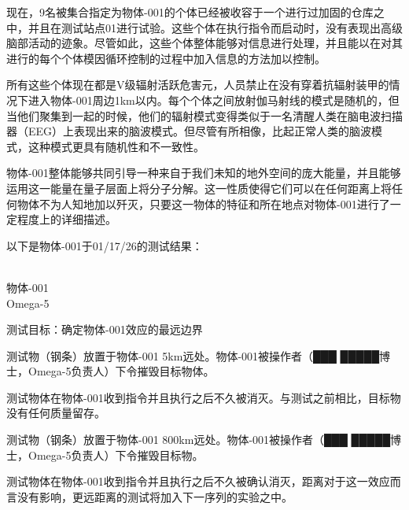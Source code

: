 \begin{scpboxbbwm}





现在，9名被集合指定为物体-001的个体已经被收容于一个进行过加固的仓库之中，并且在测试站点01进行试验。这些个体在执行指令而启动时，没有表现出高级脑部活动的迹象。尽管如此，这些个体整体能够对信息进行处理，并且能以在对其进行的每个个体模因循环控制的过程中加入信息的方法加以控制。

所有这些个体现在都是V级辐射活跃危害元，人员禁止在没有穿着抗辐射装甲的情况下进入物体-001周边1km以内。每个个体之间放射伽马射线的模式是随机的，但当他们聚集到一起的时候，他们的辐射模式变得类似于一名清醒人类在脑电波扫描器（EEG）上表现出来的脑波模式。但尽管有所相像，比起正常人类的脑波模式，这种模式更具有随机性和不一致性。

物体-001整体能够共同引导一种来自于我们未知的地外空间的庞大能量，并且能够运用这一能量在量子层面上将分子分解。这一性质使得它们可以在任何距离上将任何物体不为人知地加以歼灭，只要这一物体的特征和所在地点对物体-001进行了一定程度上的详细描述。

以下是物体-001于01/17/26的测试结果：

\hr

\\
物体-001\\
Omega-5

测试目标：确定物体-001效应的最远边界

测试物（钢条）放置于物体-001 5km远处。物体-001被操作者（███ █████博士，Omega-5负责人）下令摧毁目标物体。

测试物体在物体-001收到指令并且执行之后不久被消灭。与测试之前相比，目标物没有任何质量留存。

测试物（钢条）放置于物体-001 800km远处。物体-001被操作者（███ █████博士，Omega-5负责人）下令摧毁目标物。

测试物体在物体-001收到指令并且执行之后不久被确认消灭，距离对于这一效应而言没有影响，更远距离的测试将加入下一序列的实验之中。



\end{scpboxbbwm}
